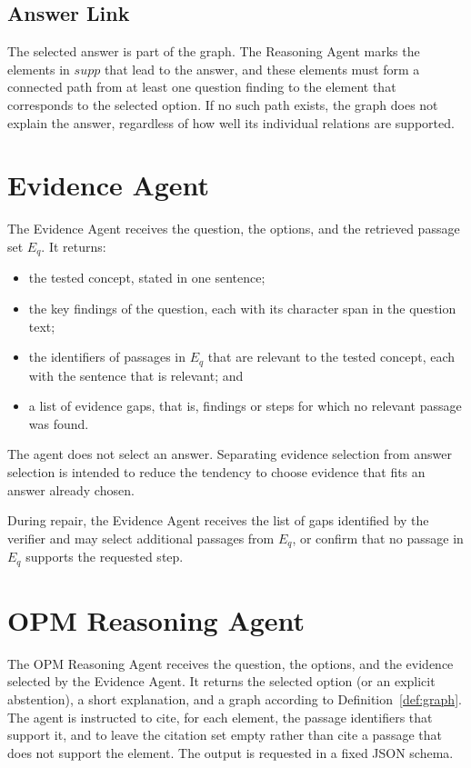 \subsection{Answer Link}

The selected answer is part of the graph. The Reasoning Agent marks the elements in $\mathit{supp}$ that lead to the answer, and these elements must form a connected path from at least one question finding to the element that corresponds to the selected option. If no such path exists, the graph does not explain the answer, regardless of how well its individual relations are supported.

\section{Evidence Agent}
\label{sec:evidence_agent}

The Evidence Agent receives the question, the options, and the retrieved passage set $E_q$. It returns:
\begin{itemize}
  \item the tested concept, stated in one sentence;
  \item the key findings of the question, each with its character span in the question text;
  \item the identifiers of passages in $E_q$ that are relevant to the tested concept, each with the sentence that is relevant; and
  \item a list of evidence gaps, that is, findings or steps for which no relevant passage was found.
\end{itemize}
The agent does not select an answer. Separating evidence selection from answer selection is intended to reduce the tendency to choose evidence that fits an answer already chosen.

During repair, the Evidence Agent receives the list of gaps identified by the verifier and may select additional passages from $E_q$, or confirm that no passage in $E_q$ supports the requested step.

\section{OPM Reasoning Agent}
\label{sec:reasoning_agent}

The OPM Reasoning Agent receives the question, the options, and the evidence selected by the Evidence Agent. It returns the selected option (or an explicit abstention), a short explanation, and a graph according to Definition~\ref{def:graph}. The agent is instructed to cite, for each element, the passage identifiers that support it, and to leave the citation set empty rather than cite a passage that does not support the element. The output is requested in a fixed JSON schema.

